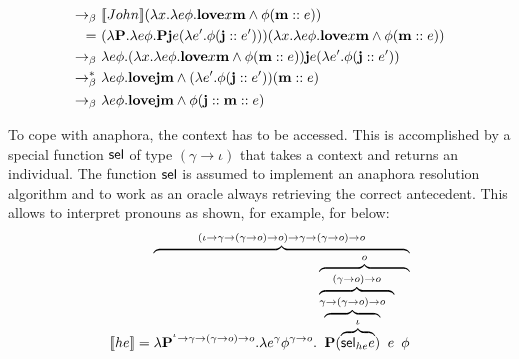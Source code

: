 \begin{example}
\begin{align}
\bconv \ &    \I{John}( \lambda \x1.  \lambda e \phi.  \textbf{love} \x1 \textbf{m} \land  \phi (\upii{\textbf{m}}{e} ))   \notag \\
= \ &    ( \lambda \P2. \lambda e \phi. \P2 \textbf{j} e (\lambda e' .\phi (\upii{\textbf{j}}{e'})))( \lambda \x1.  \lambda e \phi.  \textbf{love} \x1 \textbf{m} \land  \phi (\upii{\textbf{m}}{e} ))   \notag \\
\bconv \ &    \lambda e \phi. ( \lambda \x1.  \lambda e \phi.  \textbf{love} \x1 \textbf{m} \land  \phi (\upii{\textbf{m}}{e} ))   \textbf{j} e (\lambda e' . \phi (\upii{\textbf{j}}{e'})) \notag \\
\bred \ &    \lambda e \phi.  \textbf{love}  \textbf{j} \textbf{m} \land   (\lambda e' .\phi (\upii{\textbf{j}}{e'})) (\upii{\textbf{m}}{e} )  \notag \\
\bconv \ &    \lambda e \phi.  \textbf{love}  \textbf{j} \textbf{m} \land   \phi (\upii{\textbf{j}}{\upii{\textbf{m}}{e} })   \label{eq:2006:JohnLovesMary} 
\end{align}
\end{example}

To cope with anaphora, the context has to be accessed. This is accomplished by a special function $\mathsf{sel}$ of type $(\gamma \rightarrow \iota)$ that takes a context and returns an individual. The function $\mathsf{sel}$ is assumed to implement an anaphora resolution algorithm and to work as an oracle always retrieving the correct antecedent. This allows to interpret pronouns as shown, for example, for  below:
\begin{align}
\I{he} =  \overbrace{\lambda \P2^{^\iota \rightarrow \gamma \rightarrow (\gamma \rightarrow o) \rightarrow o}. \lambda e^{\gamma} \phi^{\gamma \rightarrow o}. \overbrace{\overbrace{\overbrace{\P2 ( \overbrace{\selK_{he} e}^{\iota} )}^{\gamma \rightarrow (\gamma \rightarrow o) \rightarrow o} e}^{ (\gamma \rightarrow o) \rightarrow o} \ \phi }^{o}}^{(\iota \rightarrow \gamma \rightarrow (\gamma \rightarrow o) \rightarrow o) \rightarrow \gamma \rightarrow (\gamma \rightarrow o) \rightarrow o}  \label{eq:he:2006}
\end{align}

